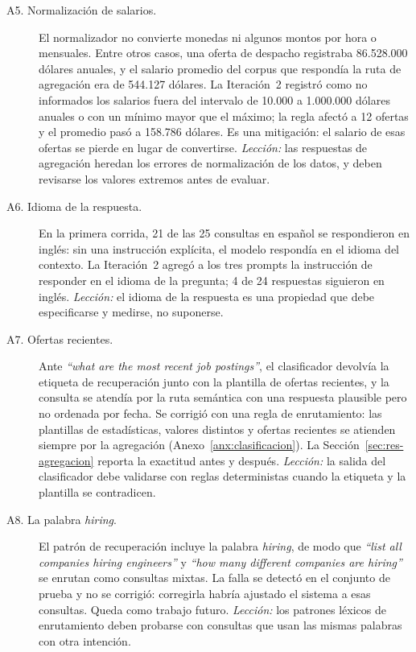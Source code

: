 \begin{description}
    \item[A5. Normalización de salarios.] El normalizador no convierte monedas ni algunos montos por hora o mensuales. Entre otros casos, una oferta de despacho registraba 86.528.000 dólares anuales, y el salario promedio del corpus que respondía la ruta de agregación era de 544.127 dólares. La Iteración~2 registró como no informados los salarios fuera del intervalo de 10.000 a 1.000.000 dólares anuales o con un mínimo mayor que el máximo; la regla afectó a 12 ofertas y el promedio pasó a 158.786 dólares. Es una mitigación: el salario de esas ofertas se pierde en lugar de convertirse. \emph{Lección:} las respuestas de agregación heredan los errores de normalización de los datos, y deben revisarse los valores extremos antes de evaluar.
    \item[A6. Idioma de la respuesta.] En la primera corrida, 21 de las 25 consultas en español se respondieron en inglés: sin una instrucción explícita, el modelo respondía en el idioma del contexto. La Iteración~2 agregó a los tres prompts la instrucción de responder en el idioma de la pregunta; 4 de 24 respuestas siguieron en inglés. \emph{Lección:} el idioma de la respuesta es una propiedad que debe especificarse y medirse, no suponerse.
    \item[A7. Ofertas recientes.] Ante \textit{\enquote{what are the most recent job postings}}, el clasificador devolvía la etiqueta de recuperación junto con la plantilla de ofertas recientes, y la consulta se atendía por la ruta semántica con una respuesta plausible pero no ordenada por fecha. Se corrigió con una regla de enrutamiento: las plantillas de estadísticas, valores distintos y ofertas recientes se atienden siempre por la agregación (Anexo~\ref{anx:clasificacion}). La Sección~\ref{sec:res-agregacion} reporta la exactitud antes y después. \emph{Lección:} la salida del clasificador debe validarse con reglas deterministas cuando la etiqueta y la plantilla se contradicen.
    \item[A8. La palabra \textit{hiring}.] El patrón de recuperación incluye la palabra \textit{hiring}, de modo que \textit{\enquote{list all companies hiring engineers}} y \textit{\enquote{how many different companies are hiring}} se enrutan como consultas mixtas. La falla se detectó en el conjunto de prueba y no se corrigió: corregirla habría ajustado el sistema a esas consultas. Queda como trabajo futuro. \emph{Lección:} los patrones léxicos de enrutamiento deben probarse con consultas que usan las mismas palabras con otra intención.
\end{description}

